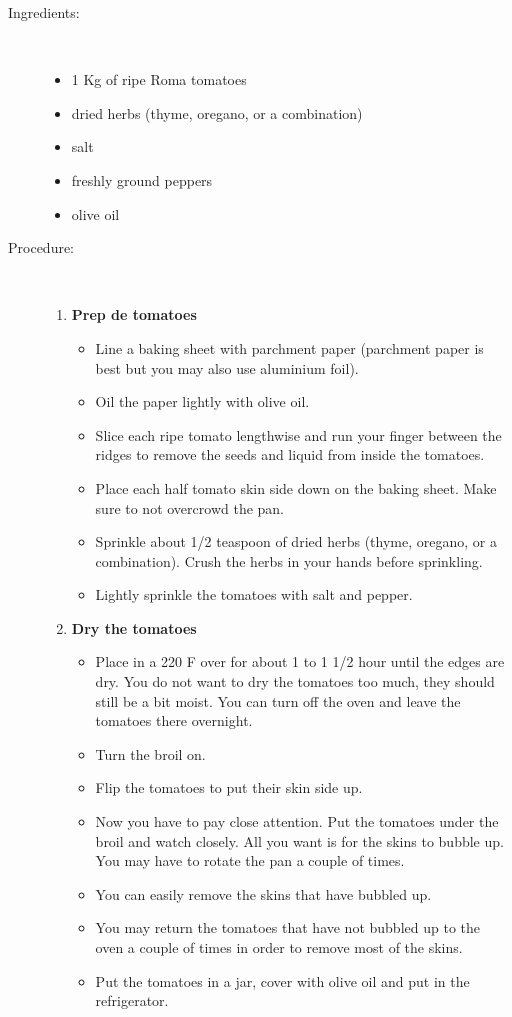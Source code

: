 \documentclass[11pt,letterpaper]{article}
\begin{document}

 
\begin{description}

\item[Ingredients:]\ \\
	\begin{itemize}
	\item 1 Kg of ripe Roma tomatoes
	\item dried herbs (thyme, oregano, or a  combination)
	\item salt
	\item freshly ground peppers
	\item olive oil
	\end{itemize}

\item[Procedure:]\ \\
	\begin{enumerate}
	\item {\bf Prep de tomatoes}
	\begin{itemize}
	\item Line a baking sheet with parchment paper (parchment paper is best
   but you may also use aluminium foil).
	\item Oil the paper lightly with olive oil.
	\item Slice each ripe tomato lengthwise and run your finger between the
   ridges to remove the seeds and liquid from inside the tomatoes.
	\item Place each half tomato skin side down on the baking sheet. Make
   sure to not overcrowd the pan.
   	\item Sprinkle about 1/2 teaspoon of dried herbs (thyme, oregano, or a
   combination). Crush the herbs in your hands before sprinkling.
	\item Lightly sprinkle the tomatoes with salt and pepper.
	\end{itemize}
	\item {\bf Dry the tomatoes}
	\begin{itemize}
	\item Place in a 220 F over for about 1 to 1 1/2 hour until the edges are
   dry. You do not want to dry the tomatoes too much, they should
   still be a bit moist. You can turn off the oven and leave the
   tomatoes there overnight.
	\item Turn the broil on.
	\item Flip the tomatoes to put their skin side up.
	\item Now you have to pay close attention. Put the tomatoes under the
    broil and watch closely. All you want is for the skins to bubble
    up. You may have to rotate the pan a couple of times.
	\item You can easily remove the skins that have bubbled up.
	\item You may return the tomatoes that have not bubbled up to the oven a
    couple of times in order to remove most of the skins.
    	\item Put the tomatoes in a jar, cover with olive oil and put in
    the refrigerator.
	\end{itemize}
	\end{enumerate}
\end{description}
\end{document}
